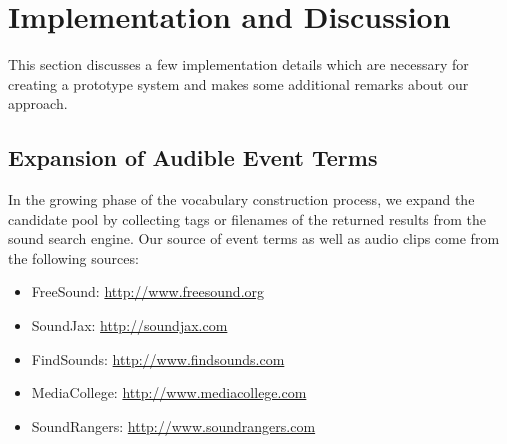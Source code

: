 \section{Implementation and Discussion}
\label{sec:impl}

This section discusses a few implementation details which are necessary for
creating a prototype system and makes some additional remarks about
our approach.

\subsection{Expansion of Audible Event Terms}
In the growing phase of the vocabulary construction process, we expand the
candidate pool by collecting tags or filenames of the returned results
from the sound search engine.
Our source of event terms as well as audio clips come from the following
sources:
\begin{itemize}
\item FreeSound: \url{http://www.freesound.org}
\item SoundJax: \url{http://soundjax.com}
\item FindSounds: \url{http://www.findsounds.com}
\item MediaCollege: \url{http://www.mediacollege.com}
\item SoundRangers: \url{http://www.soundrangers.com}
\end{itemize}

